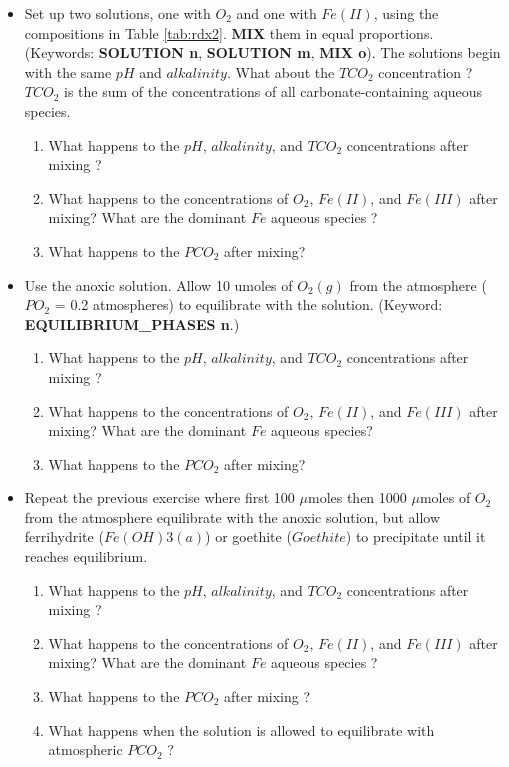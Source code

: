 \begin{itemize}
\item Set up two solutions, one with $O_2$ and one with $Fe(II)$, using the compositions in Table \ref{tab:rdx2}. {\color{red} \textbf{MIX}} them in equal proportions. (Keywords: {\color{red} \textbf{SOLUTION n}}, {\color{red} \textbf{SOLUTION m}}, {\color{red} \textbf{MIX o}}). The solutions begin with the same $pH$ and $alkalinity$. What about the $TCO_2$ concentration ? $TCO_2$ is the sum of the concentrations of all carbonate-containing aqueous species. 
	\begin{enumerate} 
	\item What happens to the $pH$, $alkalinity$, and $TCO_2$ concentrations after mixing ?
	\item What happens to the concentrations of $O_2$, $Fe(II)$, and $Fe(III)$ after mixing?  What are the dominant $Fe$ aqueous species ?
	\item What happens to the $PCO_2$ after mixing?
	\end{enumerate} 
\item Use the anoxic solution. Allow 10 umoles of $O_2(g)$ from the atmosphere ($PO_2$ = 0.2 atmospheres) to equilibrate with the solution. 
(Keyword: {\color{red} \textbf{EQUILIBRIUM\_PHASES n}}.)
  \begin{enumerate} 
	\item What happens to the $pH$, $alkalinity$, and $TCO_2$ concentrations after mixing ?
	\item What happens to the concentrations of $O_2$, $Fe(II)$, and $Fe(III)$ after mixing?  What are the dominant $Fe$ aqueous species?
	\item What happens to the $PCO_2$ after mixing?
  \end{enumerate}
\item Repeat the previous exercise where first 100 $\mu$moles then 1000 $\mu$moles of $O_2$ from the atmosphere equilibrate with the anoxic solution, but allow ferrihydrite ($Fe(OH)3(a)$) or goethite ($Goethite$) to precipitate until it reaches equilibrium.
	\begin{enumerate}  
	\item What happens to the $pH$, $alkalinity$, and $TCO_2$ concentrations after mixing ?
	\item What happens to the concentrations of $O_2$, $Fe(II)$, and $Fe(III)$ after mixing?  What are the dominant $Fe$ aqueous species ?
	\item What happens to the $PCO_2$ after mixing ?
	\item What happens when the solution is allowed to equilibrate with atmospheric $PCO_2$ ?

\end{enumerate}
\end{itemize}
